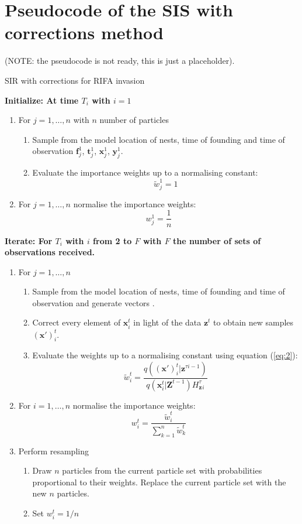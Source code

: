 \documentclass[11pt,a4paper]{article}
\renewcommand{\vec}[1]{\mathbf{#1}}
\begin{document}
{\color{red}
\section{Pseudocode of the SIS with corrections method}

(NOTE: the pseudocode is not ready, this is just a placeholder).

\begin{algorithm}[H]
\caption{SIR with corrections for RIFA invasion}
 \begin{algorithmic}

 \State  \bf{Initialize:} \normalfont At time $T_i$ with $i = 1$
            
\begin{enumerate}
	\item For $j = 1, \dots , n$ with $n$ number of particles
	\begin{enumerate}
		\item Sample from the model location of nests, time of founding and time of observation $\vec{f}^1_j$, $\vec{t}^1_j$, $\vec{x}^1_j$, $\vec{y}^1_j$.
		\item Evaluate the importance weights up to a normalising constant:
		\[
		\tilde{w}^{1}_{j} = 1
		\]
	\end{enumerate}
	\item For $j = 1, \dots , n$ normalise the importance weights: 
	\[
	w^{1}_{j} = \frac{1}{n}
	\]
\end{enumerate}

 \State  \bf{Iterate:} \normalfont For $T_i$ with $i$ from 2 to $F$ with $F$ the number of sets of observations received.

\begin{enumerate}
	\item For $j = 1, \dots , n$
	\begin{enumerate}
  		\item Sample from the model location of nests, time of founding and time of observation and generate vectors .
		\item Correct every element of $\vec{x}^t_i$ in light of the data $\vec{z}^t$ to obtain new samples $(\vec{x'})^t_i$.
		\item Evaluate the weights up to a normalising constant using equation (\ref{eq:2}):
		\[
		\tilde{w}^{t}_{i} = \frac{q(\vec{(x')}^{t}_i| \vec{z}^{\tau{i-1}})}{q(\vec{x}^{t}_i | \vec{Z}^{t-1}) H_\vec{z}^{\tau}_i}
		\]
	\end{enumerate}
	\item For $i = 1, \dots , n$ normalise the importance weights:
	\[
	w^{t}_{i} = \frac{\tilde{w}^t_i}{\sum_{k=1}^{n}\tilde{w}^{t}_k}
	\]
	\item Perform resampling
	\begin{enumerate}
	    \item Draw $n$ particles from the current particle set with probabilities proportional to their weights. Replace the current particle set with the new $n$ particles.
	    \item Set $w^t_i=1/n$
	\end{enumerate}
\end{enumerate}
  

\end{algorithmic}
\end{algorithm}}
\end{document}
